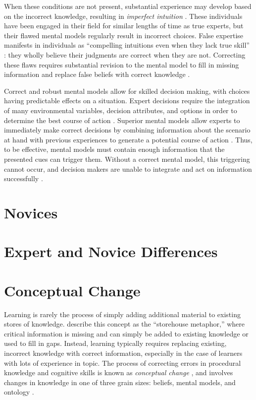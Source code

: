 When these conditions are not present, substantial experience may develop based on the incorrect knowledge, resulting in \emph{imperfect intuition} \citep{Kahneman2009}. These individuals have been engaged in their field for similar lengths of time as true experts, but their flawed mental models regularly result in incorrect choices. False expertise manifests in individuals as ``compelling intuitions even when they lack true skill'' \citep{Kahneman2009}: they wholly believe their judgments are correct when they are not. Correcting these flaws requires substantial revision to the mental model to fill in missing information and replace false beliefs with correct knowledge \citep{Klein2006, Chi2008}.

Correct and robust mental models allow for skilled decision making, with choices having predictable effects on a situation. Expert decisions require the integration of many environmental variables, decision attributes, and options in order to determine the best course of action \citep{Klein2008}. Superior mental models allow experts to immediately make correct decisions \citep{Klein1992} by combining information about the scenario at hand with previous experiences to generate a potential course of action \citep{Klein1999}. Thus, to be effective, mental models must contain enough information that the presented cues can trigger them. Without a correct mental model, this triggering cannot occur, and decision makers are unable to integrate and act on information successfully \citep{Lipshitz1997}.

\section{Novices}


\section{Expert and Novice Differences}


\section{Conceptual Change}

Learning is rarely the process of simply adding additional material to existing stores of knowledge. \citet{Klein2006} describe this concept as the ``storehouse metaphor,'' where critical information is missing and can simply be added to existing knowledge or used to fill in gaps. Instead, learning typically requires replacing existing, incorrect knowledge with correct information, especially in the case of learners with lots of experience in topic. The process of correcting errors in procedural knowledge and cognitive skills is known as \emph{conceptual change} \citep{Chi2008}, and involves changes in knowledge in one of three grain sizes: beliefs, mental models, and ontology \citep{Gadgil2012}.


